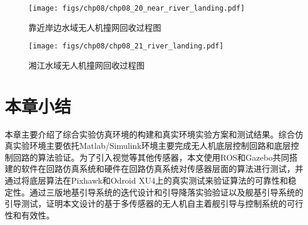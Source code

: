 \begin{figure}[!ht]
	\centering
	\texttt{[image: figs/chp08/chp08\_20\_near\_river\_landing.pdf]}	
	\caption{靠近岸边水域无人机撞网回收过程图}
	\label{fig:chp08_20_near_river_landing}
\end{figure}

\begin{figure}[!ht]
	\centering
	\texttt{[image: figs/chp08/chp08\_21\_river\_landing.pdf]}	
	\caption{湘江水域无人机撞网回收过程图}
	\label{fig:chp08_21_river_landing}
\end{figure}


\section{本章小结}
本章主要介绍了综合实验仿真环境的构建和真实环境实验方案和测试结果。综合仿真实验环境主要依托Matlab/Simulink环境主要完成无人机底层控制回路和底层控制回路的算法验证。为了引入视觉等其他传感器，本文使用ROS和Gazebo共同搭建的软件在回路仿真系统和硬件在回路仿真系统对传感器层面的算法进行测试，并通过将底层算法在Pixhawk和Odroid XU4上的真实测试来验证算法的可靠性和稳定性。通过三版地基引导系统的迭代设计和引导降落实验验证以及舰基引导系统的引导测试，证明本文设计的基于多传感器的无人机自主着舰引导与控制系统的可行性和有效性。